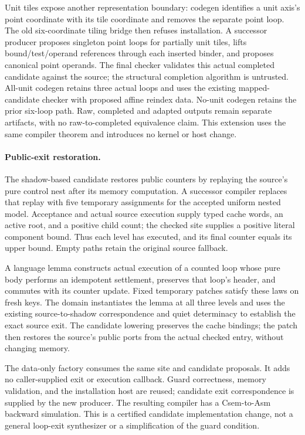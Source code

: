 Unit tiles expose another representation boundary: codegen identifies a unit
axis's point coordinate with its tile coordinate and removes the separate
point loop. The old six-coordinate tiling bridge then refuses installation.
A successor producer proposes singleton point loops for partially unit tiles,
lifts bound/test/operand references through each inserted binder, and proposes
canonical point operands. The final checker validates this actual completed
candidate against the source; the structural completion algorithm is
untrusted. All-unit codegen retains three actual loops and uses the existing
mapped-candidate checker with proposed affine reindex data. No-unit codegen
retains the prior six-loop path. Raw, completed and adapted outputs remain
separate artifacts, with no raw-to-completed equivalence claim. This extension
uses the same compiler theorem and introduces no kernel or host change.

\paragraph{Public-exit restoration.}
The shadow-based candidate restores public counters by replaying the source's
pure control nest after its memory computation. A successor compiler replaces
that replay with five temporary assignments for the accepted uniform nested
model. Acceptance and actual source execution supply typed cache words, an
active root, and a positive child count; the checked site supplies a positive
literal component bound. Thus each level has executed, and its final counter
equals its upper bound. Empty paths retain the original source fallback.

A language lemma constructs actual execution of a counted loop whose pure body
performs an idempotent settlement, preserves that loop's header, and commutes
with its counter update. Fixed temporary patches satisfy these laws on fresh
keys. The domain instantiates the lemma at all three levels and uses the
existing source-to-shadow correspondence and quiet determinacy to establish
the exact source exit. The candidate lowering preserves the cache bindings;
the patch then restores the source's public ports from the actual checked
entry, without changing memory.

The data-only factory consumes the same site and candidate proposals. It adds
no caller-supplied exit or execution callback. Guard correctness, memory
validation, and the installation host are reused; candidate exit correspondence
is supplied by the new producer. The resulting compiler has a Csem-to-Asm
backward simulation. This is a certified candidate implementation change, not
a general loop-exit synthesizer or a simplification of the guard condition.

